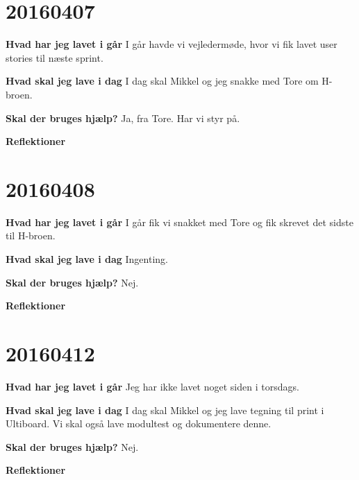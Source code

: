 \documentclass{article}
\begin{document}
	\section{20160407}
	
	\textbf{Hvad har jeg lavet i går}
	I går havde vi vejledermøde, hvor vi fik lavet user stories til næste sprint. 
	
	\textbf{Hvad skal jeg lave i dag}
	I dag skal Mikkel og jeg snakke med Tore om H-broen. 
	
	\textbf{Skal der bruges hjælp?}
	Ja, fra Tore. Har vi styr på. 
	
	\textbf{Reflektioner}
	
	\section{20160408}
	
	\textbf{Hvad har jeg lavet i går}
	I går fik vi snakket med Tore og fik skrevet det sidste til H-broen. 
	
	\textbf{Hvad skal jeg lave i dag}
	Ingenting. 
	
	\textbf{Skal der bruges hjælp?}
	Nej. 
	
	\textbf{Reflektioner}
	
	\section{20160412}
	
	\textbf{Hvad har jeg lavet i går}
	Jeg har ikke lavet noget siden i torsdags. 
	
	\textbf{Hvad skal jeg lave i dag}
	I dag skal Mikkel og jeg lave tegning til print i Ultiboard. Vi skal også lave modultest og dokumentere denne. 
	
	\textbf{Skal der bruges hjælp?}
	Nej. 
	
	\textbf{Reflektioner}
	
	
\end{document}
